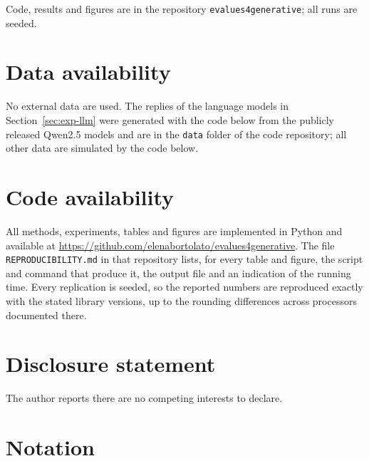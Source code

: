 \documentclass[11pt]{article}
\theoremstyle{remark}
\begin{document}
Code, results and figures are in the repository \texttt{evalues4generative};
all runs are seeded.

\section*{Data availability}
No external data are used. The replies of the language models in
Section~\ref{sec:exp-llm} were generated with the code below from the publicly
released Qwen2.5 models and are in the \texttt{data} folder of the code
repository; all other data are simulated by the code below.

\section*{Code availability}
All methods, experiments, tables and figures are implemented in Python and
available at \url{https://github.com/elenabortolato/evalues4generative}. The
file \texttt{REPRODUCIBILITY.md} in that repository lists, for every table
and figure, the script and command that produce it, the output file and an
indication of the running time. Every replication is seeded, so the reported
numbers are reproduced exactly with the stated library versions, up to the
rounding differences across processors documented there.

\section*{Disclosure statement}
The author reports there are no competing interests to declare.




\appendix



\section{Notation}\label{app:notation}
\end{document}
